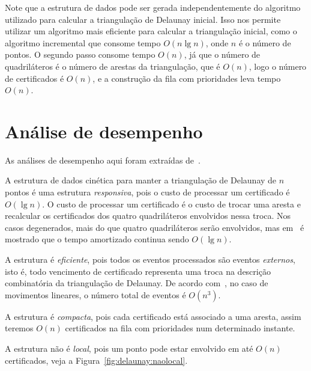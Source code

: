 Note que a estrutura de dados pode ser gerada independentemente do algoritmo utilizado para
calcular a triangulação de Delaunay inicial.
Isso nos permite utilizar um algoritmo mais eficiente para calcular a triangulação inicial, como o
algoritmo incremental que consome tempo $O(n\lg{n})$, onde $n$ é o número de pontos.
O segundo passo consome tempo $O(n)$, já que o número de quadriláteros é o número de arestas da
triangulação, que é $O(n)$, logo o número de certificados é $O(n)$, e a construção da fila com
prioridades leva tempo $O(n)$.


\section{Análise de desempenho}\label{sec:delaunay:analise-de-desempenho}

As análises de desempenho aqui foram extraídas de~\cite{eduardo}.

A estrutura de dados cinética para manter a triangulação de Delaunay de $n$ pontos é uma estrutura
\textit{responsiva}, pois o custo de processar um certificado é $O(\lg{n})$.
O custo de processar um certificado é o custo de trocar uma aresta e recalcular os certificados dos
quatro quadriláteros envolvidos nessa troca.
Nos casos degenerados, mais do que quatro quadriláteros serão envolvidos, mas
em~\cite{guibas-mitchell-roos} é mostrado que o tempo amortizado continua sendo $O(\lg{n})$.

A estrutura é \textit{eficiente}, pois todos os eventos processados são eventos \textit{externos},
isto é, todo vencimento de certificado representa uma troca na descrição combinatória da
triangulação de Delaunay.
De acordo com~\cite{eduardo}, no caso de movimentos lineares, o número total de eventos é
$O(n^3)$.

A estrutura é \textit{compacta}, pois cada certificado está associado a uma aresta, assim teremos
$O(n)$ certificados na fila com prioridades num determinado instante.

A estrutura não é \textit{local}, pois um ponto pode estar envolvido em até $O(n)$
certificados, veja a Figura~\ref{fig:delaunay:naolocal}.


